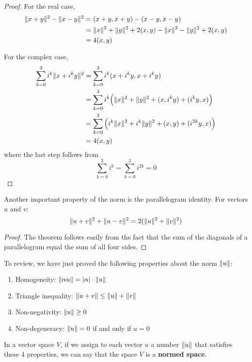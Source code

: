 \begin{proof}
For the real case, 
$$ 
\begin{aligned}
\lVert x + y\rVert^{2} - \lVert x - y\rVert^{2} &= (x + y, x + y) - (x - y, x - y) \\
&= \lVert x\rVert^{2} + \lVert y\rVert^{2} + 2 (x, y) - \lVert x\rVert^{2} - \lVert y\rVert^{2} + 2 (x, y) \\ 
&= 4 (x, y)
\end{aligned}
$$

For the complex case, 
$$
\begin{aligned}
\sum_{k = 0}^{3} i^{k} \lVert x + i^{k}y\rVert^{2} &= \sum_{k = 0}^{3} i^{k} (x + i^{k}y, x + i^{k}y) \\
&= \sum_{k = 0}^{3} i^{k} \Big( \lVert x\rVert^{2} + \lVert y\rVert^{2} + (x, i^{k}y) + (i^{k}y, x) \Big) \\
&= \sum_{k = 0}^{3} \Big( i^{k} \lVert x\rVert^{2} + i^{k} \lVert y\rVert^{2} + (x, y) + (i^{2k} y, x) \Big) \\
&= 4 (x, y)
\end{aligned}
$$
where the last step follows from 
$$ \sum_{k = 0}^{3} i^{k} = \sum_{k = 0}^{3} i^{2k} = 0$$
\end{proof}

\begin{theorem}
Another important property of the norm is the parallelogram identity. For vectors $u$ and $v$: 
$$\lVert u + v\rVert^{2} + \lVert u - v\rVert^{2} = 2( \lVert u\rVert^{2} + \lVert v\rVert^{2} )$$
\end{theorem}

\begin{proof}
The theorem follows easily from the fact that the sum of the diagonals of a parallelogram equal the sum of all four sides. 
\end{proof}

To review, we have just proved the following properties about the norm $\lVert u\rVert$: 
\begin{enumerate}
	\item Homogeneity: $\lVert\alpha u\rVert = \lvert\alpha\rvert \cdot \lVert u\rVert$ 
	\item Triangle inequality: $\lVert u + v\rVert \leq \lVert u\rVert + \lVert v\rVert$
	\item Non-negativity: $\lVert u\rVert \geq 0$ 
	\item Non-degeneracy: $\lVert u\rVert = 0$ if and only if $u = 0$
\end{enumerate}

In a vector space $V$, if we assign to each vector $u$ a number $\lVert u\rVert$ that satisfies these 4 properties, we can say that the space $V$ is a \textbf{normed space}. 

